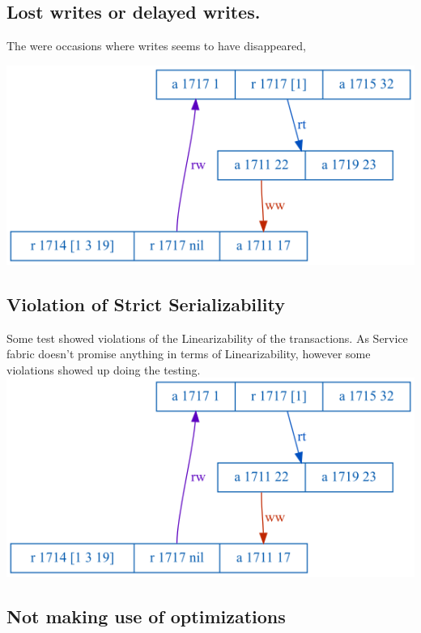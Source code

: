 \documentclass[a4paper,10pt,titlepage]{report}
\begin{document}
    \subsection{Lost writes or delayed writes.}
    
    The were occasions where writes seems to have disappeared, 
    
    \includegraphics[]{Report/results/store-2021-11-02-checkme-3/SF reliableappend RR (RR) pause,clock/20211102T014633.000Z/elle/G-single-realtime/1.png}
    
    \subsection{Violation of Strict Serializability}
    
    Some test showed violations of the Linearizability of the transactions. As Service fabric doesn't promise anything in terms of Linearizability, however some violations showed up doing the testing.
\\
\includegraphics[]{Report/results/store-2021-11-02-checkme-3/SF reliableappend RR (RR) pause,clock/20211102T014633.000Z/elle/G-single-realtime/1.png}



    \subsection{Not making use of optimizations}
    
\end{document}
